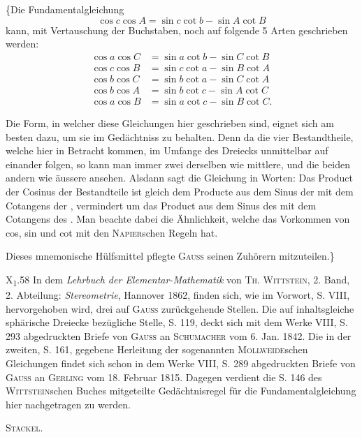 \clearpage{}\NoSourceHead
{}
\indent \{Die Fundamentalgleichung
\[
\cos c\cos A=\sin c\cot b-\sin A\cot B
\]
\noindent kann, mit Vertauschung der Buchstaben, noch auf folgende 5 Arten geschrieben werden:
\[
\begin{aligned}
\cos a\cos C&=\sin a\cot b-\sin C\cot B\\
\cos c\cos B&=\sin c\cot a-\sin B\cot A\\
\cos b\cos C&=\sin b\cot a-\sin C\cot A\\
\cos b\cos A&=\sin b\cot c-\sin A\cot C\\
\cos a\cos B&=\sin a\cot c-\sin B\cot C.
\end{aligned}
\]

\indent Die Form, in welcher diese Gleichungen hier geschrieben sind, eignet sich am besten dazu, um sie im Gedächtniss zu behalten. Denn da die vier Bestandtheile, welche hier in Betracht kommen, im Umfange des Dreiecks unmittelbar auf einander folgen, so kann man immer zwei derselben wie mittlere, und die beiden andern wie äussere ansehen. Alsdann sagt die Gleichung in Worten: Das Product der Cosinus der  Bestandteile ist gleich dem Producte aus dem Sinus der  mit dem Cotangens der , vermindert um das Product aus dem Sinus des  mit dem Cotangens des . Man beachte dabei die Ähnlichkeit, welche das Vorkommen von cos, sin und cot mit den \textsc{Napier}schen Regeln hat.

\indent Dieses mnemonische Hülfsmittel pflegte \textsc{Gauss} seinen Zuhörern mitzuteilen.\}
\par\vfill\noindent X\textsubscript{1}.\hfill 58
\clearpage{}
\begingroup\small
{}
\indent In dem \textit{Lehrbuch der Elementar-Mathematik} von \textsc{Th. Wittstein}, 2. Band, 2. Abteilung: \textit{Stereometrie}, Hannover 1862, finden sich, wie im Vorwort, S. VIII, hervorgehoben wird, drei auf \textsc{Gauss} zurückgehende Stellen. Die auf inhaltsgleiche sphärische Dreiecke bezügliche Stelle, S. 119, deckt sich mit dem Werke VIII, S. 293 abgedruckten Briefe von \textsc{Gauss} an \textsc{Schumacher} vom 6. Jan. 1842. Die in der zweiten, S. 161, gegebene Herleitung der sogenannten \textsc{Mollweide}schen Gleichungen findet sich schon in dem Werke VIII, S. 289 abgedruckten Briefe von \textsc{Gauss} an \textsc{Gerling} vom 18. Februar 1815. Dagegen verdient die S. 146 des \textsc{Wittstein}schen Buches mitgeteilte Gedächtnisregel für die Fundamentalgleichung hier nachgetragen zu werden.
\par\noindent\hfill\textsc{Stäckel}.
\ClosingRule
\par\endgroup
